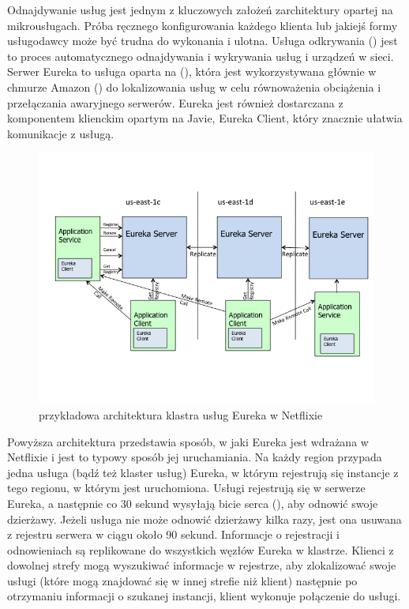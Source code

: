 Odnajdywanie usług jest jednym z kluczowych założeń zarchitektury opartej na mikrousługach. Próba ręcznego konfigurowania każdego klienta lub jakiejś formy usługodawcy może być trudna do wykonania i ulotna. Usługa odkrywania () jest to proces automatycznego odnajdywania i wykrywania usług i urządzeń w sieci. Serwer Eureka to usługa oparta na  (), która jest wykorzystywana głównie w chmurze Amazon  () do lokalizowania usług w celu równoważenia obciążenia i przełączania awaryjnego serwerów. Eureka jest również dostarczana z komponentem klienckim opartym na Javie, Eureka Client, który znacznie ułatwia komunikacje z usługą\cite{netflixEurekaArticleWang}\cite{netflixEurekaGithub}\cite{springEureka}\cite{netflixEurekaManual}.

\begin{figure}[!htbp]
    \centering
    \includegraphics[width=\textwidth, trim={0 4cm 0 0}]{images/netflixEureka/eureka_architecture.png}
    \caption{przykładowa architektura klastra usług Eureka w Netflixie\cite{netflixEurekaGithub}}
    \label{fig:enter-label}
\end{figure}

Powyższa architektura przedstawia sposób, w jaki Eureka jest wdrażana w Netflixie i jest to typowy sposób jej uruchamiania. Na każdy region przypada jedna usługa (bądź też klaster usług) Eureka, w którym rejestrują się instancje z tego regionu, w którym jest uruchomiona. Usługi rejestrują się w serwerze Eureka, a następnie co 30 sekund wysyłają bicie serca (), aby odnowić swoje dzierżawy. Jeżeli usługa nie może odnowić dzierżawy kilka razy, jest ona usuwana z rejestru serwera w ciągu około 90 sekund. Informacje o rejestracji i odnowieniach są replikowane do wszystkich węzłów Eureka w klastrze. Klienci z dowolnej strefy mogą wyszukiwać informacje w rejestrze, aby zlokalizować swoje usługi (które mogą znajdować się w innej strefie niż klient) następnie po otrzymaniu informacji o szukanej instancji, klient wykonuje połączenie do usługi\cite{netflixEurekaArticleWang}\cite{netflixEurekaGithub}\cite{springEureka}\cite{netflixEurekaManual}.

